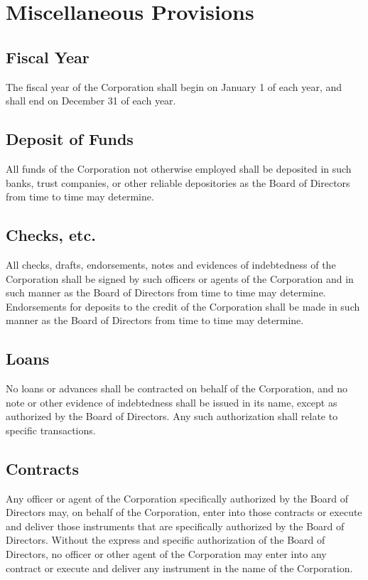\section{Miscellaneous Provisions}

\subsection{Fiscal Year}
The fiscal year of the Corporation shall begin on January 1 of each
year, and shall end on December 31 of each year.

\subsection{Deposit of Funds}
All funds of the Corporation not otherwise employed shall be deposited
in such banks, trust companies, or other reliable depositories as the
Board of Directors from time to time may determine.

\subsection{Checks, etc.}
All checks, drafts, endorsements, notes and evidences of indebtedness
of the Corporation shall be signed by such officers or agents of the
Corporation and in such manner as the Board of Directors from time to
time may determine. Endorsements for deposits to the credit of the
Corporation shall be made in such manner as the Board of Directors
from time to time may determine.

\subsection{Loans}
No loans or advances shall be contracted on behalf of the Corporation,
and no note or other evidence of indebtedness shall be issued in its
name, except as authorized by the Board of Directors. Any such
authorization shall relate to specific transactions.

\subsection{Contracts}
Any officer or agent of the Corporation specifically authorized by the
Board of Directors may, on behalf of the Corporation, enter into those
contracts or execute and deliver those instruments that are
specifically authorized by the Board of Directors. Without the express
and specific authorization of the Board of Directors, no officer or
other agent of the Corporation may enter into any contract or execute
and deliver any instrument in the name of the Corporation.

